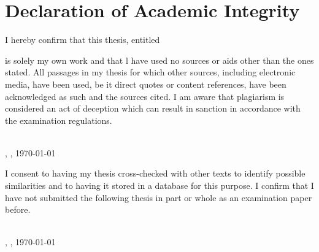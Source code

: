 \chapter*{Declaration of Academic Integrity}

I hereby confirm that this thesis, entitled

\begin{center}
\textit{\printtitle}
\end{center}

is solely my own work and that l have used no sources or aids other than the ones stated. All passages in my thesis for which other sources, including electronic media, have been used, be it direct quotes or content references, have been acknowledged as such and the sources cited. I am aware that plagiarism is considered an act of deception which can result in sanction in accordance with the examination regulations.

\vspace{0.75cm}
\parbox{17em}{\hrulefill} \\
\printname, \printcity, \today

\vspace{0.75cm}

I consent to having my thesis cross-checked with other texts to identify possible similarities and to having it stored in a database for this purpose. I confirm that I have not submitted the following thesis in part or whole as an examination paper before.

\vspace{0.75cm}
\parbox{17em}{\hrulefill} \\
\printname, \printcity, \today